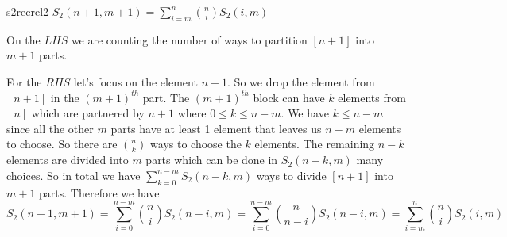 \documentclass[twoside]{article}
\begin{document}
\begin{Theorem}{}{s2recrel2}
	$S_2(n+1,m+1)= \displaystyle\sum\limits_{i=m}^n  \binom{n}{i}  S_2(i,m)$
\end{Theorem}
\begin{combi-proof}
	On the $LHS$ we are counting the number of ways to partition $[n+1]$ into $m+1$ parts. 
	
	For the $RHS$ let's focus on the element $n+1$. So we drop the element from $[n+1]$ in the $(m+1)^{th}$ part. The $(m+1)^{th}$ block can have $k$ elements from $[n]$ which are partnered by $n+1$ where $0\leq k\leq n-m$. We have $k\leq n-m$ since all the other $m$ parts have at least 1 element that leaves us $n-m$ elements to choose. So there are $\binom{n}{k}$ ways to choose the $k$ elements. The remaining $n-k$ elements are divided into $m$ parts which can be done in $S_2(n-k,m)$ many choices. So in total we have $\sum\limits_{k=0}^{n-m}S_2(n-k,m)$ ways to divide $[n+1]$ into $m+1$ parts. Therefore we have $$S_2(n+1,m+1)=\sum\limits_{i=0}^{n-m}\binom{n}{i}S_2(n-i,m)=\sum\limits_{i=0}^{n-m}\binom{n}{n-i}S_2(n-i,m)=\sum\limits_{i=m}^{n}\binom{n}{i}S_2(i,m)$$
\end{combi-proof}
\end{document}
